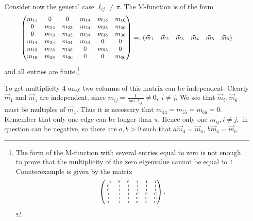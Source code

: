 \documentclass{amsart}
\theoremstyle{definition}
\theoremstyle{remark}
\numberwithin{equation}{section}
\begin{document}
 
 
 Consider now the general case $ \ell_{ij} \neq \pi$.  The M-function is of the form
$$ \small \begin{pmatrix}
m_{11} & 0  & 0 & m_{14} &m_{15} & m_{16}\\
0 & m_{22}  & m_{23} & m_{24} &m_{25} & m_{26}\\
0 & m_{23}  & m_{33} & m_{34} &m_{35} & m_{36}\\
m_{14} &m_{24} & m_{34} &m_{44}&0&0\\
m_{15} &m_{25} & m_{35} &0&m_{55}&0\\
m_{16} &m_{26} & m_{36}&0&0 &m_{66}\\
\end{pmatrix} =: \begin{pmatrix}\vec{m}_1 & \vec{m}_2& \vec{m}_3&\vec{m}_4 & \vec{m}_5& \vec{m}_6\end{pmatrix}
$$
and all entries are finite.\footnote{The form of the M-function with several entries equal to zero is not enough to prove that the multiplicity
 of the zero eigenvalue cannot be equal to $4$. Counterexample is given by  the matrix
 $$ \tiny \begin{pmatrix}
-1 & 0  & 0 & 1 & 1 & 1\\
0 & 1  & 1 & 1 & 1 & 1\\
0 & 1  & 1 & 1 & 1 & 1\\
1 &1 & 1 & 0&0&0\\
1 &1 & 1 & 0&0&0\\
1 &1 & 1 & 0&0&0\\
\end{pmatrix} .$$ 
}


To get multiplicity 4 only two columns of this matrix can be independent. Clearly $\vec{m}_1$ and $\vec{m}_4$ are independent, since $ m_{ij} = \frac{1}{\sin \ell_{ij}} \neq 0, \; i \neq j $.
We see that $\vec{m}_5,\vec{m}_6$ must be multiples of $\vec{m}_4$. 
Thus it is necessary that $m_{44}=m_{55}=m_{66}=0$. Remember that only one edge can be longer than $ \pi $. Hence only one $ m_{ij}, i \neq j , $ in question can be negative,
so there are $a,b>0$ such that $a\vec{m}_4=\vec{m}_5$, $b\vec{m}_4=\vec{m}_6$. 
\end{document}
